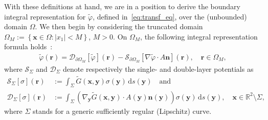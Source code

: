 \documentclass[review,hidelinks,onefignum,onetabnum]{siamart220329}
\newcommand{\R}{\mathbb{R}}
\newcommand{\bn}{\mathbf{n}}
\newcommand{\bx}{\mathbf{x}}
\newcommand{\by}{\mathbf{y}}
\newcommand{\br}{\boldsymbol{r}}
\newcommand{\de}{\,\mathrm{d}}
\newcommand{\tvarphi}{\widetilde \varphi}
\begin{document}
With these definitions at hand, we are in a position to derive the boundary integral representation for $\tvarphi$, defined in~\eqref{eq:transf_eq}, over the (unbounded) domain $\Omega$. We then begin by considering the truncated domain $\Omega_M := \left\{\bx \in \Omega : |x_1| <  M \right\}$, $M>0$. On $\Omega_M$, the following integral representation formula holds~\cite{mclean2000strongly}:
\begin{align}
  \label{eq:greens-representation-bounded}
  \tvarphi(\br) = \mathcal{D}_{\partial \Omega_M}[\tvarphi](\br) - \mathcal{S}_{\partial \Omega_M}[\nabla \tvarphi \cdot A \bn](\br), \quad \br \in \Omega_M,
\end{align}
where $\mathcal{S}_\Sigma$ and $\mathcal{D}_\Sigma$ denote respectively the single- and double-layer potentials  as
\begin{subequations}
\begin{align}
    \label{eq:SL-pot}
    \mathcal{S}_{\Sigma}[\sigma](\br) &:= \int_\Sigma \widetilde{G}(\bx,\by) \sigma(\by) \de s(\by)\quad\text{and}\\
    \label{eq:DL-pot}
    \mathcal{D}_{\Sigma}[\sigma](\br) &:= \int_\Sigma \left( \nabla_{\by} \widetilde{G}(\bx,\by) \cdot A(\by)\bn(\by) \right) \sigma(\by) \de s(\by),\quad\bx\in\R^2\setminus\Sigma,
\end{align}
\label{eq:potentials}
\end{subequations}
where $\Sigma$ stands for a generic sufficiently regular (Lipschitz) curve. 
\end{document}
